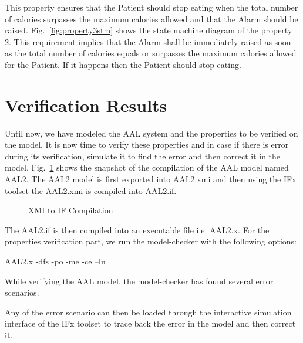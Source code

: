 \documentclass[a4paper,twoside]{article}
\begin{document}
  
This property ensures that the Patient should stop eating when the total number of calories surpasses the maximum calories allowed and that the Alarm should be raised. Fig.~\ref{fig:property3stm} shows the state machine diagram of the property 2. This requirement implies that the Alarm shall be immediately raised as soon as the total number of calories equals or surpasses the maximum calories allowed for the Patient. If it happens then the Patient should stop eating.  

\section{Verification Results}
\label{sec:results}
Until now, we have modeled the AAL system and the properties to be verified on the model. It is now time to verify these properties and in case if there is error during its verification, simulate it to find the error and then correct it in the model. Fig.~\ref{fig:xmi2if} shows the snapshot of the compilation of the AAL model named AAL2. The AAL2 model is first exported into AAL2.xmi and then using the IFx toolset the AAL2.xmi is compiled into AAL2.if.

\begin{figure}[!h]
  \centering
  {}
  \caption{XMI to IF Compilation}
  \label{fig:xmi2if}
 \end{figure}
  
 
The AAL2.if is then compiled into an executable file i.e. AAL2.x.
For the properties verification part, we run the model-checker with the following options:

AAL2.x -dfs -po -me -ce –ln

While verifying the AAL model, the model-checker has found several error scenarios. 

Any of the error scenario can then be loaded through the interactive simulation interface of the IFx toolset to trace back the error in the model and then correct it. 
\end{document}
